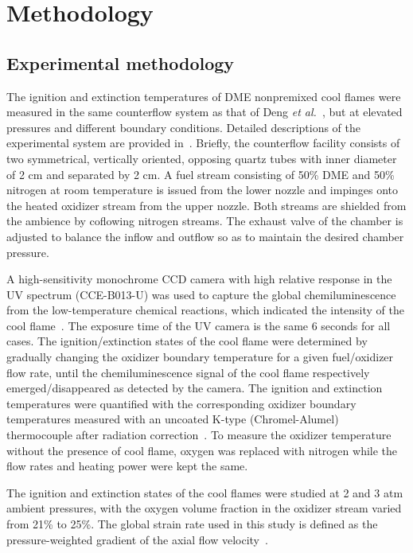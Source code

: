\documentclass[review,3p,times]{elsarticle}
\begin{document}

\section{Methodology}

\subsection{Experimental methodology}

The ignition and extinction temperatures of DME nonpremixed cool flames were measured in the same counterflow system as that of Deng \emph{et al.}~\cite{deng14}, but at elevated pressures and different boundary conditions.  Detailed descriptions of the experimental system are provided in~\cite{fotache95,liu10}.  Briefly, the counterflow facility consists of two symmetrical, vertically oriented, opposing quartz tubes with inner diameter of 2 cm and separated by 2 cm.  A fuel stream consisting of 50\% DME and 50\% nitrogen at room temperature is issued from the lower nozzle and impinges onto the heated oxidizer stream from the upper nozzle.  Both streams are shielded from the ambience by coflowing nitrogen streams. The exhaust valve of the chamber is adjusted to balance the inflow and outflow so as to maintain the desired chamber pressure.

A high-sensitivity monochrome CCD camera with high relative response in the UV spectrum (CCE-B013-U) was used to capture the global chemiluminescence from the low-temperature chemical reactions, which indicated the intensity of the cool flame~\cite{zhao16}.  The exposure time of the UV camera is the same 6 seconds for all cases.  The ignition/extinction states of the cool flame were determined by gradually changing the oxidizer boundary temperature for a given fuel/oxidizer flow rate, until the chemiluminescence signal of the cool flame respectively emerged/disappeared as detected by the camera.  The ignition and extinction temperatures were quantified with the corresponding oxidizer boundary temperatures measured with an uncoated K-type (Chromel-Alumel) thermocouple after radiation correction~\cite{fotache95}.   \textcolor{Rev1}{To measure the oxidizer temperature without the presence of cool flame, oxygen was replaced with nitrogen while the flow rates and heating power were kept the same.}

The ignition and extinction states of the cool flames were studied at 2 and 3 atm ambient pressures, with the oxygen volume fraction in the oxidizer stream varied from 21\% to 25\%.  The global strain rate used in this study is defined as the pressure-weighted gradient of the axial flow velocity~\cite{seiser00}.
\end{document}
